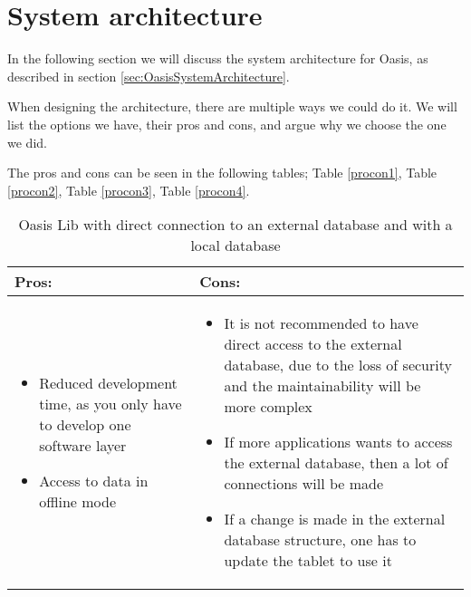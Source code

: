 \section{System architecture}
In the following section we will discuss the system architecture for Oasis, as described in section \vref{sec:OasisSystemArchitecture}.

When designing the architecture, there are multiple ways we could do it. We will list the options we have, their pros and cons, and argue why we choose the one we did.

The pros and cons can be seen in the following tables; Table \vref{procon1}, Table \vref{procon2}, Table \vref{procon3}, Table \vref{procon4}.

\begin{table}[htbp]
	\centering
		\begin{tabular}{| p{6cm} | m{6cm} |}
			\hline
			\textbf{Pros:} & \textbf{Cons:} \\ \hline
\begin{itemize}
	\item Reduced development time, as you only have to develop one software layer
	\item Access to data in offline mode
\end{itemize}
&
\begin{itemize}
	\item It is not recommended to have direct access to the external database, due to the loss of security and the maintainability will be more complex
	\item If more applications wants to access the external database, then a lot of connections will be made
	\item If a change is made in the external database structure, one has to update the tablet to use it
\end{itemize}
\\ \hline
		\end{tabular}
	\caption{Oasis Lib with direct connection to an external database and with a local database}
	\label{tab:procon1}
\end{table}

